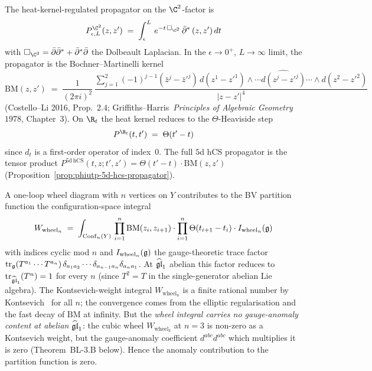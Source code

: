 \begin{proposition}
\label{prop:bl-bv-propagator-c2}
The heat-kernel-regulated propagator on the $\C^2$-factor is
\[
  P_{\epsilon, L}^{\C^2}(z, z')
  \;=\;
  \int_\epsilon^L\, e^{-t\,\Box_{\C^2}}\,\bar\partial^*\,(z, z')\, dt
\]
with $\Box_{\C^2} = \bar\partial\bar\partial^* + \bar\partial^*\bar\partial$
the Dolbeault Laplacian. In the $\epsilon\to 0^+$, $L\to\infty$
limit, the propagator is the Bochner--Martinelli kernel
\[
  \mathrm{BM}(z, z')
  \;=\;
  \frac{1}{(2\pi i)^2}\,
  \frac{\sum_{j=1}^2 (-1)^{j-1} (\bar z^j - \bar z'^j)\,
  d(z^1 - z'^1)\wedge\cdots\widehat{d(z^j - z'^j)}\cdots\wedge d(z^2 - z'^2)}{|z - z'|^4}
\]
(Costello--Li 2016, Prop.~$2.4$; Griffiths--Harris~\textit{Principles of
Algebraic Geometry}~$1978$, Chapter~$3$).
On $\R_t$ the heat kernel reduces to the $\Theta$-Heaviside step
\[
  P^{\R_t}(t, t') \;=\; \Theta(t' - t)
\]
since $d_t$ is a first-order operator of index~$0$.
The full $5$d hCS propagator is the tensor product
$P^{5\mathrm{d\,hCS}}(t, z; t', z') = \Theta(t' - t)\cdot\mathrm{BM}(z, z')$
(Proposition~\ref{prop:phiutp-5d-hcs-propagator}).
\end{proposition}

\begin{remark}
\label{rem:bl-bv-wheel-integral}
A one-loop wheel diagram with $n$ vertices on $Y$ contributes to the
BV partition function the configuration-space integral
\[
  W_{\mathrm{wheel}_n}
  \;=\;
  \int_{\mathrm{Conf}_n(Y)}\,
  \prod_{i=1}^n \mathrm{BM}(z_i, z_{i+1})\cdot
  \prod_{i=1}^n \Theta(t_{i+1} - t_i)\cdot
  I_{\mathrm{wheel}_n}(\mathfrak{g})
\]
with indices cyclic mod $n$ and $I_{\mathrm{wheel}_n}(\mathfrak{g})$ the
gauge-theoretic trace factor
$\mathrm{tr}_{\mathfrak{g}}(T^{a_1}\cdots T^{a_n})\, \delta_{a_1 a_2}\cdots
\delta_{a_{n-1} a_n}\delta_{a_n a_1}$.
At $\widehat{\mathfrak{gl}}_1$ abelian this factor reduces to
$\mathrm{tr}_{\widehat{\mathfrak{gl}}_1}(T^n) = 1$ for every $n$ (since $T^2 = T$ in the
single-generator abelian Lie algebra). The Kontsevich-weight integral
$W_{\mathrm{wheel}_n}$ is a finite rational number by
Kontsevich~\cite{Kontsevich1994} for all $n$; the convergence comes
from the elliptic regularisation and the fast decay of $\mathrm{BM}$
at infinity. But the \emph{wheel integral carries no gauge-anomaly
content at abelian $\widehat{\mathfrak{gl}}_1$}: the cubic wheel $W_{\mathrm{wheel}_3}$
at $n = 3$ is non-zero as a Kontsevich weight, but the
gauge-anomaly coefficient $d^{abc}d^{abc}$ which multiplies it is
zero (Theorem~BL-$3$.B below). Hence the anomaly contribution to the
partition function is zero.
\end{remark}

